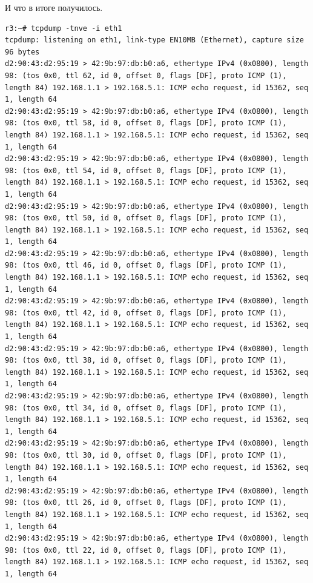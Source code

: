\documentclass[a4paper,12pt]{article}
\begin{document}
И что в итоге получилось.

\begin{Verbatim}
r3:~# tcpdump -tnve -i eth1
tcpdump: listening on eth1, link-type EN10MB (Ethernet), capture size 96 bytes
d2:90:43:d2:95:19 > 42:9b:97:db:b0:a6, ethertype IPv4 (0x0800), length 98: (tos 0x0, ttl 62, id 0, offset 0, flags [DF], proto ICMP (1), length 84) 192.168.1.1 > 192.168.5.1: ICMP echo request, id 15362, seq 1, length 64
d2:90:43:d2:95:19 > 42:9b:97:db:b0:a6, ethertype IPv4 (0x0800), length 98: (tos 0x0, ttl 58, id 0, offset 0, flags [DF], proto ICMP (1), length 84) 192.168.1.1 > 192.168.5.1: ICMP echo request, id 15362, seq 1, length 64
d2:90:43:d2:95:19 > 42:9b:97:db:b0:a6, ethertype IPv4 (0x0800), length 98: (tos 0x0, ttl 54, id 0, offset 0, flags [DF], proto ICMP (1), length 84) 192.168.1.1 > 192.168.5.1: ICMP echo request, id 15362, seq 1, length 64
d2:90:43:d2:95:19 > 42:9b:97:db:b0:a6, ethertype IPv4 (0x0800), length 98: (tos 0x0, ttl 50, id 0, offset 0, flags [DF], proto ICMP (1), length 84) 192.168.1.1 > 192.168.5.1: ICMP echo request, id 15362, seq 1, length 64
d2:90:43:d2:95:19 > 42:9b:97:db:b0:a6, ethertype IPv4 (0x0800), length 98: (tos 0x0, ttl 46, id 0, offset 0, flags [DF], proto ICMP (1), length 84) 192.168.1.1 > 192.168.5.1: ICMP echo request, id 15362, seq 1, length 64
d2:90:43:d2:95:19 > 42:9b:97:db:b0:a6, ethertype IPv4 (0x0800), length 98: (tos 0x0, ttl 42, id 0, offset 0, flags [DF], proto ICMP (1), length 84) 192.168.1.1 > 192.168.5.1: ICMP echo request, id 15362, seq 1, length 64
d2:90:43:d2:95:19 > 42:9b:97:db:b0:a6, ethertype IPv4 (0x0800), length 98: (tos 0x0, ttl 38, id 0, offset 0, flags [DF], proto ICMP (1), length 84) 192.168.1.1 > 192.168.5.1: ICMP echo request, id 15362, seq 1, length 64
d2:90:43:d2:95:19 > 42:9b:97:db:b0:a6, ethertype IPv4 (0x0800), length 98: (tos 0x0, ttl 34, id 0, offset 0, flags [DF], proto ICMP (1), length 84) 192.168.1.1 > 192.168.5.1: ICMP echo request, id 15362, seq 1, length 64
d2:90:43:d2:95:19 > 42:9b:97:db:b0:a6, ethertype IPv4 (0x0800), length 98: (tos 0x0, ttl 30, id 0, offset 0, flags [DF], proto ICMP (1), length 84) 192.168.1.1 > 192.168.5.1: ICMP echo request, id 15362, seq 1, length 64
d2:90:43:d2:95:19 > 42:9b:97:db:b0:a6, ethertype IPv4 (0x0800), length 98: (tos 0x0, ttl 26, id 0, offset 0, flags [DF], proto ICMP (1), length 84) 192.168.1.1 > 192.168.5.1: ICMP echo request, id 15362, seq 1, length 64
d2:90:43:d2:95:19 > 42:9b:97:db:b0:a6, ethertype IPv4 (0x0800), length 98: (tos 0x0, ttl 22, id 0, offset 0, flags [DF], proto ICMP (1), length 84) 192.168.1.1 > 192.168.5.1: ICMP echo request, id 15362, seq 1, length 64

\end{Verbatim}
\end{document}
